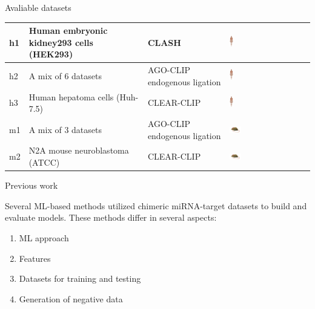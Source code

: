 \documentclass{beamer}
\begin{document}
\begin{frame}{Avaliable datasets}
\begin{table}[h!]
{\begin{tabular}{|l|p{5cm}|p{4cm}|l|}
    h1 &
	\textbf{Human embryonic kidney293 cells (HEK293)} & 
	CLASH  & 
	 \includegraphics[width=0.05\textwidth]{images/human.png} \\
	\hline
	
    h2 &
	A mix of 6 datasets & 
	AGO-CLIP endogenous ligation &  
	 \includegraphics[width=0.05\textwidth]{images/human.png} \\
	\hline
	
    h3 &
	Human hepatoma cells (Huh-7.5) & 
	CLEAR-CLIP & 
	 \includegraphics[width=0.05\textwidth]{images/human.png} \\
	\hline
	
    m1 &
	A mix of 3 datasets & 
	AGO-CLIP endogenous ligation & 
	 \includegraphics[width=0.15\textwidth]{images/mosmus.jpg} \\
	\hline
	
    m2 &
	N2A mouse neuroblastoma (ATCC) & 
	CLEAR-CLIP & 
	 \includegraphics[width=0.15\textwidth]{images/mosmus.jpg} \\
	\hline
\end{tabular}}
\end{table}


\end{frame}



\begin{frame}{Previous work}

Several ML-based methods utilized chimeric miRNA-target datasets to build and evaluate models. These methods differ in several aspects:
\begin{enumerate}
\item ML approach
\item Features
\item Datasets for training and testing
\item Generation of negative data
\end{enumerate}

\end{frame}
\end{document}
